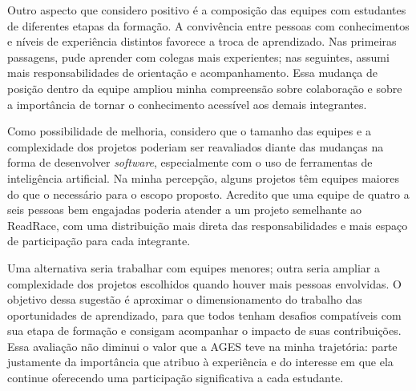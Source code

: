 Outro aspecto que considero positivo é a composição das equipes com estudantes de diferentes etapas da formação. A convivência entre pessoas com conhecimentos e níveis de experiência distintos favorece a troca de aprendizado. Nas primeiras passagens, pude aprender com colegas mais experientes; nas seguintes, assumi mais responsabilidades de orientação e acompanhamento. Essa mudança de posição dentro da equipe ampliou minha compreensão sobre colaboração e sobre a importância de tornar o conhecimento acessível aos demais integrantes.

Como possibilidade de melhoria, considero que o tamanho das equipes e a complexidade dos projetos poderiam ser reavaliados diante das mudanças na forma de desenvolver \textit{software}, especialmente com o uso de ferramentas de inteligência artificial. Na minha percepção, alguns projetos têm equipes maiores do que o necessário para o escopo proposto. Acredito que uma equipe de quatro a seis pessoas bem engajadas poderia atender a um projeto semelhante ao ReadRace, com uma distribuição mais direta das responsabilidades e mais espaço de participação para cada integrante.

Uma alternativa seria trabalhar com equipes menores; outra seria ampliar a complexidade dos projetos escolhidos quando houver mais pessoas envolvidas. O objetivo dessa sugestão é aproximar o dimensionamento do trabalho das oportunidades de aprendizado, para que todos tenham desafios compatíveis com sua etapa de formação e consigam acompanhar o impacto de suas contribuições. Essa avaliação não diminui o valor que a \ac{AGES} teve na minha trajetória: parte justamente da importância que atribuo à experiência e do interesse em que ela continue oferecendo uma participação significativa a cada estudante.
